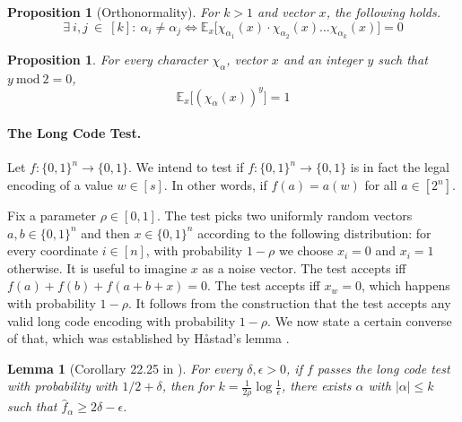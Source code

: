\documentclass[11pt]{article}
\newtheorem{lemma}[theorem]{Lemma}
\newtheorem{proposition}[theorem]{Proposition}
\newcommand{\eat}[1]{}
\begin{document}
\begin{proposition}[Orthonormality]\label{equality} For $k > 1$ and vector $x$, the following holds. 
\[
\exists \ i,j \ \in \ [k]: \ \alpha_i \ne \alpha_j \Leftrightarrow
\mathbb{E}_x\Big[ \chi_{\alpha_1}(x) \cdot \chi_{\alpha_2}(x) \ldots
\chi_{\alpha_k}(x)\Big] = 0
\]
\end{proposition}


\begin{proposition}\label{orthonormal}
  For every character $\chi_\alpha$, vector $x$ and an integer $y$ such that $y\ \mbox{mod}\ 2 = 0$, 
 \[\mathbb{E}_x\big[\left(\chi_\alpha\left(x\right)\right)^y\big]  =  1 \]
\end{proposition}



\paragraph{The Long Code Test.}\label{LC} Let $f : \{0,1\}^n \rightarrow \{0,1\}$. 
We intend to test if $f : \{0,1\}^n \rightarrow \{0,1\}$ is in fact
the legal encoding of a value $w \in [s]$. In other words, if $f(a) =
a(w)$ for all $a \in [2^n]$.

Fix a parameter $\rho \in [0,1]$. The test picks two uniformly random
vectors $a,b \in \{0,1\}^n$ and then ${x} \in \{0,1\}^n$ according to
the following distribution: for every coordinate $i \in [n]$, with
probability $1 - \rho$ we choose $x_i = 0$ and $x_i = 1$ otherwise.
It is useful to imagine ${x}$ as a noise vector. The test accepts iff
$f({a}) + f({b}) + f({a + b + x}) = 0$. The test accepts iff $x_w =
0$, which happens with probability $1 - \rho$. It follows from the
construction that the test accepts any valid long code encoding with
probability $1 - \rho$. We now state a certain converse of that, which
was established by H{\aa}stad's lemma \cite{Has97}.

\eat{\begin{lemma}[H{\aa}stad's lemma \cite{Has97}] If the test
    accepts $A$ with probability $1/2 + \delta$, then $\sum_\alpha
    \hat{A}^3_\alpha \cdot (1 - 2\rho)^{|\alpha|} \ge 2\alpha$.
\end{lemma}
}
\begin{lemma}[Corollary 22.25 in \cite{AB}]
  For every $\delta, \epsilon > 0$, if $f$ passes the long code test
  with probability with $1/2 + \delta$, then for $k =
  \frac{1}{2\rho}\log\frac{1}{\epsilon}$, there exists $\alpha$ with
  $|\alpha| \le k$ such that $\hat{f}_\alpha \ge 2\delta - \epsilon$.
\end{lemma}
\end{document}
